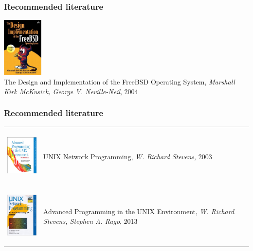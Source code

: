 \documentclass{beamer}
\begin{document}
\begin{frame}
\frametitle{Recommended literature}
\center\includegraphics[height=3cm]{img/book_mcckusick.jpg}\\
The Design and Implementation of the FreeBSD Operating System,
\textit{Marshall Kirk McKusick, George V. Neville-Neil}, 2004 \\
\end{frame}

\begin{frame}
\frametitle{Recommended literature}
\begin{center}
\begin{tabular}{ p{3cm} p{6cm} }
\includegraphics[height=3cm]{img/book_unix.jpg} &
UNIX Network Programming,
\textit{W. Richard Stevens}, 2003 \\
\includegraphics[height=3cm]{img/book_unp.jpg} &
Advanced Programming in the UNIX Environment,
\textit{W. Richard Stevens, Stephen A. Rago}, 2013
\end{tabular}
\end{center}
\end{frame}
\end{document}
